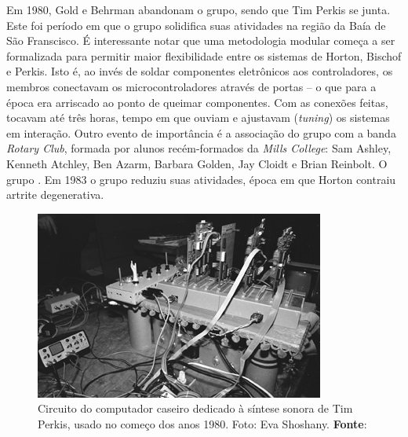 Em 1980, Gold e Behrman abandonam o grupo, sendo que Tim Perkis se junta. Este foi período em que o grupo solidifica suas atividades na região da Baía de São Franscisco. É interessante notar que uma metodologia modular começa a ser formalizada para permitir maior flexibilidade entre os sistemas de Horton, Bischof e Perkis. Isto é, ao invés de soldar componentes eletrônicos aos controladores, os membros conectavam os microcontroladores através de portas -- o que para a época era arriscado ao ponto de queimar componentes. Com as conexões feitas, tocavam até três horas, tempo em que ouviam e ajustavam (\emph{tuning}) os sistemas em interação\cite[7$^o$ parágrafo]{brown_indigenous_2013}. Outro evento de importância é a associação do grupo com a banda \emph{Rotary Club}, formada por alunos recém-formados da \emph{Mills College}: Sam Ashley, Kenneth Atchley, Ben Azarm, Barbara Golden, Jay Cloidt e Brian Reinbolt. O grupo \cite[8$^o$ parágrafo]{brown_indigenous_2013}. Em 1983 o grupo reduziu suas atividades, época em que Horton contraiu artrite degenerativa.

\begin{figure}[!h]
    \centering
    \includegraphics[scale=0.7]{imagens/perkis.jpg}
    \caption{Circuito do computador caseiro dedicado à síntese sonora de Tim Perkis, usado no começo dos anos 1980. Foto: Eva Shoshany\protect\footnotemark. \textbf{Fonte}: }
    \label{fig:perkis}
  \end{figure}


